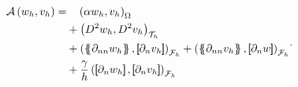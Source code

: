 \begin{equation}
\label{eq:CP_A_h}
\begin{split}
\mathcal{A} \left( w_{h}, v_{h} \right)   =&
  \quad  \left( \alpha  w_{h}, v_{h} \right) _{\Omega }\\
&  +  \left( D^2 w_{h}, D^2v_{h} \right) _{\mathcal{T} _{h}} \\
 & +
  \left( \mean{  \partial _{n n} w_{h} }, \jump{ \partial _{n }v_{h}} \right)_{\mathcal{F}_{h}}  +
 \left( \mean{ \partial _{n n} v_{h} }, \jump{ \partial _{n}w }      \right)_{\mathcal{F}_{h}}
 \\
 & + \frac{\gamma }{h}  \left( \jump{ \partial _{n} w_{h}}, \jump{ \partial _{n} v_{h}   }   \right)_{\mathcal{F}_{h}} \\
\end{split}
.
\end{equation}


